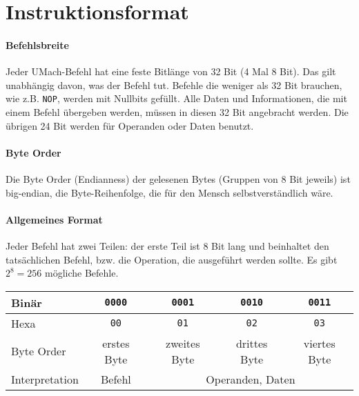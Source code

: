 \section{Instruktionsformat}

\paragraph{Befehlsbreite}
Jeder UMach-Befehl hat eine feste Bitlänge von 32 Bit (4 Mal 8 Bit).
Das gilt unabhängig davon, was der Befehl tut. Befehle die weniger als 32 Bit
brauchen, wie z.B. \texttt{NOP}, werden mit Nullbits gefüllt.
Alle Daten und Informationen, die mit einem Befehl übergeben werden, müssen in
diesen 32 Bit angebracht werden. Die übrigen 24 Bit werden für Operanden oder
Daten benutzt.

\paragraph{Byte Order}
Die Byte Order (Endianness) der gelesenen Bytes (Gruppen von 8 Bit jeweils) ist
big-endian, die Byte-Reihenfolge, die für den Mensch selbstverständlich wäre.


\paragraph{Allgemeines Format}
Jeder Befehl hat zwei Teilen: der erste Teil ist 8 Bit lang und beinhaltet den
tatsächlichen Befehl, bzw. die Operation, die ausgeführt werden sollte. Es gibt
$2^{8} = 256$ mögliche Befehle.

\begin{center}
  \begin{tabular}{l|*{4}{c|}}
    Binär &
    \texttt{0000} & \texttt{0001} & \texttt{0010} & \texttt{0011} \\\hline
    Hexa  &
    \texttt{00} & \texttt{01} & \texttt{02} & \texttt{03}         \\\hline
    Byte Order &
    erstes Byte & zweites Byte & drittes Byte & viertes Byte      \\\hline
    Interpretation &
    Befehl &
    \multicolumn{3}{c|}{Operanden, Daten} \\\hline
  \end{tabular}
\end{center}


